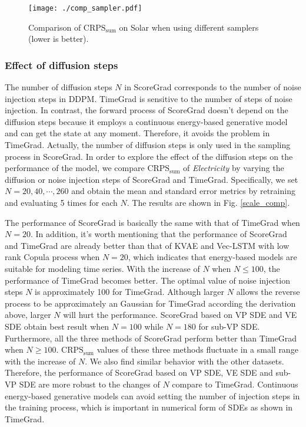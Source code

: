 \begin{figure}[t]
	\centering
	\texttt{[image: ./comp\_sampler.pdf]} 
	\caption{Comparison of $\text{CRPS}_{\text{sum}}$ on Solar when using different samplers (lower is better).}
	\label{comp_sampler}
\end{figure}

\subsubsection{Effect of diffusion steps}
The number of diffusion steps $N$ in ScoreGrad corresponds to the number of noise injection steps in DDPM. TimeGrad is sensitive to the number of steps of noise injection. In contrast, the forward process of ScoreGrad doesn't depend on the diffusion steps because it employs a continuous energy-based generative model and can get the state at any moment. Therefore, it avoids the problem in TimeGrad. Actually, the number of diffusion steps is only used in the sampling process in ScoreGrad. In order to explore the effect of the diffusion steps on the performance of the model, we compare $\text{CRPS}_{\text{sum}}$ of \textit{Electricity} by varying the diffusion or noise injection steps of ScoreGrad and TimeGrad. Specifically, we set $N=20,40,\cdots, 260$ and obtain the mean and standard error metrics by retraining and evaluating 5 times for each $N$. The results are shown in Fig. \ref{scale_comp}.

The performance of ScoreGrad is basically the same with that of TimeGrad when $N=20$. In addition, it's worth mentioning that the performance of ScoreGrad and TimeGrad are already better than that of KVAE and Vec-LSTM with low rank Copula process when $N=20$, which indicates that energy-based models are suitable for modeling time series. With the increase of $N$ when $N\leq 100$, the performance of TimeGrad becomes better. The optimal value of noise injection steps $N$ is approximately 100 for TimeGrad. Although larger $N$ allows the reverse process to be approximately an Gaussian for TimeGrad according the derivation above, larger $N$ will hurt the performance. ScoreGrad based on VP SDE and VE SDE obtain best result when $N=100$ while $N=180$ for sub-VP SDE. Furthermore, all the three methods of ScoreGrad perform better than TimeGrad when $N\geq 100$. $\text{CRPS}_{\text{sum}}$ values of these three methods fluctuate in a small range with the increase of $N$. We also find similar behavior with the other datasets. Therefore, the performance of ScoreGrad based on VP SDE, VE SDE and sub-VP SDE are more robust to the changes of $N$ compare to TimeGrad. Continuous energy-based generative models can avoid setting the number of injection steps in the training process, which is important in numerical form of SDEs as shown in TimeGrad.

